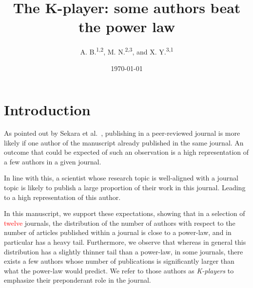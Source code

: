 \documentclass[aps,prl,floatfix,twocolumn]{revtex4-1}
\begin{document}
\title{The K-player: some authors beat the power law}

\author{A. B.\textsuperscript{1,2}, M. N.\textsuperscript{2,3}, and X. Y.\textsuperscript{3,1}}

\date{\today}

\begin{abstract}
 \textcolor{red}{\lipsum[1]}
\end{abstract}

\maketitle

\section{Introduction} 
As pointed out by Sekara et al.~\cite{Sek18}, publishing in a peer-reviewed journal is more likely if one author of the manuscript already published in the same journal.
An outcome that could be expected of such an observation is a high representation of a few authors in a given journal. 

In line with this, a scientist whose research topic is well-aligned with a journal topic is likely to publish a large proportion of their work in this journal.
Leading to a high representation of this author. 

In this manuscript, we support these expectations, showing that in a selection of \textcolor{red}{twelve} journals, the distribution of the number of authors with respect to the number of articles published within a journal is close to a power-law, and in particular has a heavy tail. 
Furthermore, we observe that whereas in general this distribution has a slightly thinner tail than a power-law, in some journals, there exists a few authors whose number of publications is significantly larger than what the power-law would predict. 
We refer to those authors as \emph{K-players} to emphasize their preponderant role in the journal. 
\end{document}
